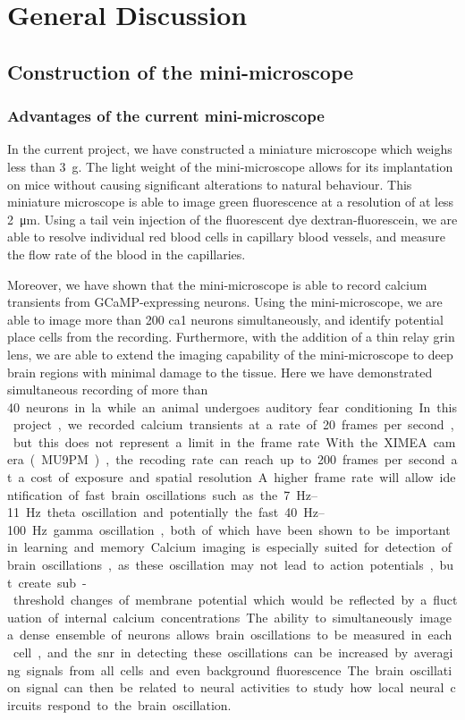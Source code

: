\chapter{General Discussion}
\section{Construction of the mini-microscope}
\subsection{Advantages of the current mini-microscope}
In the current project, we have constructed a miniature microscope which weighs less than \SI{3}{\gram}. The light weight of the mini-microscope allows for its implantation on mice without causing significant alterations to natural behaviour.  This miniature microscope is able to image green fluorescence at a resolution of at less \SI{2}{\um}. Using a tail vein injection of the fluorescent dye dextran-fluorescein, we are able to resolve individual red blood cells in capillary blood vessels, and measure the flow rate of the blood in the capillaries. 

Moreover, we have shown that the mini-microscope is able to record calcium transients from GCaMP-expressing neurons. Using the mini-microscope, we are able to image more than \num{200} \gls{ca1} neurons simultaneously, and identify potential place cells from the recording. Furthermore, with the addition of a thin relay \gls{grin} lens, we are able to extend the imaging capability of the mini-microscope to deep brain regions with minimal damage to the tissue. Here we have demonstrated simultaneous recording of more than \SI{40} neurons in \gls{la} while an animal undergoes auditory fear conditioning. 

In this project, we recorded calcium transients at a rate of \num{20} frames per second, but this does not represent a limit in the frame rate. With the XIMEA camera (MU9PM), the recoding rate can reach up to \num{200} frames per second at a cost of exposure and spatial resolution. A higher frame rate will allow identification of fast brain oscillations such as the \SIrange{7}{11}{\hertz} theta oscillation and potentially the fast \SIrange{40}{100}{\hertz} gamma oscillation, both of which have been shown to be important in learning and memory. Calcium imaging is especially suited for detection of brain oscillations, as these oscillation may not lead to action potentials, but create sub-threshold changes of membrane potential which would be reflected by a fluctuation of internal calcium concentrations. The ability to simultaneously image a dense ensemble of neurons allows brain oscillations to be measured in each cell, and the \gls{snr} in detecting these oscillations can be increased by averaging signals from all cells and even background fluorescence. The brain oscillation signal can then be related to neural activities to study how local neural circuits respond to the brain oscillation. 

